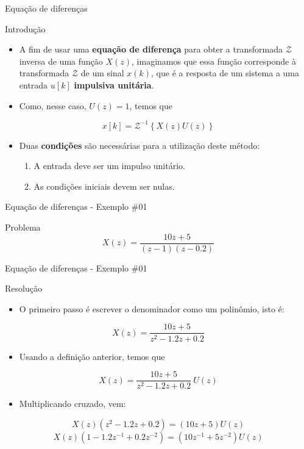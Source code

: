 \begin{frame}{Equação de diferenças}
\begin{block}{Introdução}
\begin{itemize}
	\item A fim de usar uma \textbf{equação de diferença} para  obter a transformada $\mathcal{Z}$ inversa de uma função $X(z)$, imaginamos que essa função corresponde à transformada $\mathcal{Z}$ de um sinal $x(k)$, que é a resposta de um sistema a uma entrada $u[k]$ \textbf{impulsiva unitária}. 
	\item Como, nesse caso, $U(z) = 1$, temos que
\end{itemize}
$$\boxed{x[k] = \mathcal{Z}^{-1} \left\lbrace X(z)U(z) \right\rbrace}$$
\begin{itemize}
	\item Duas \textbf{condições} são necessárias para a utilização deste  método: 
	\begin{enumerate}
	    \item A entrada deve ser um impulso unitário.
	    \item As condições iniciais devem ser nulas.
	\end{enumerate}
\end{itemize}
\end{block}
\end{frame}

\begin{frame}{Equação de diferenças - Exemplo \#01}
\begin{block}{Problema}
	\[ X(z)=\dfrac{10z+5}{
		\left(z-1\right)
		\left(z-\num{0.2}\right)} \]
\end{block}
\end{frame}

\begin{frame}{Equação de diferenças - Exemplo \#01}
\begin{block}{Resolução}
\begin{itemize}
    \item O primeiro passo é escrever o denominador como um polinômio, isto é:
\end{itemize}
	\[X(z)=\dfrac{10z+5}{z^2-\num{1.2}z+\num{0.2}}\]
\begin{itemize}
    \item Usando a definição anterior, temos que
\end{itemize}
    \[X(z)=\dfrac{10z+5}{z^2-\num{1.2}z+\num{0.2}} \ U(z)\] 
\begin{itemize}
    \item Multiplicando cruzado, vem:
\end{itemize}
    \[X(z)\left(z^2-\num{1.2}z+\num{0.2}\right) = \left(10z+5\right)U(z)\]
    \[X(z)\left(1-\num{1.2}z^{-1}+\num{0.2}z^{-2}\right) = \left(10z^{-1}+5z^{-2}\right)U(z)\]
\end{block}
\end{frame}

